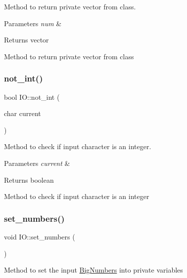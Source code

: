 Method to return private vector from class. 


\begin{DoxyParams}{Parameters}
{\em num} & \\
\hline
\end{DoxyParams}
\begin{DoxyReturn}{Returns}
vector
\end{DoxyReturn}
Method to return private vector from class \mbox{\label{classIO_a96a29f45bb9632611271d945aeee6b2a}} 
\subsubsection{\texorpdfstring{not\+\_\+int()}{not\_int()}}
{\footnotesize\ttfamily bool I\+O\+::not\+\_\+int (\begin{DoxyParamCaption}\item[{char}]{current }\end{DoxyParamCaption})}



Method to check if input character is an integer. 


\begin{DoxyParams}{Parameters}
{\em current} & \\
\hline
\end{DoxyParams}
\begin{DoxyReturn}{Returns}
boolean
\end{DoxyReturn}
Method to check if input character is an integer \mbox{\label{classIO_a51997957fe3ae3bb8f8a72e2a41debf5}} 
\subsubsection{\texorpdfstring{set\+\_\+numbers()}{set\_numbers()}}
{\footnotesize\ttfamily void I\+O\+::set\+\_\+numbers (\begin{DoxyParamCaption}{ }\end{DoxyParamCaption})}

Method to set the input \mbox{\hyperlink{classBigNumbers}{Big\+Numbers}} into private variables \mbox{\label{classIO_a258e39776df5a07ad72c7816ac0acdf2}} 
